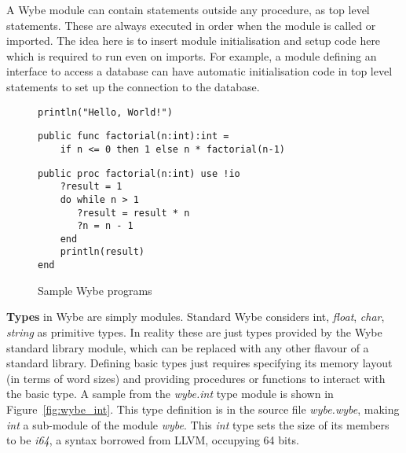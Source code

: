 A Wybe module can contain statements outside any procedure, as top level
statements. These are always executed in order when the module is called or
imported. The idea here is to insert module initialisation and setup code here
which is required to run even on imports. For example, a module defining an
interface to access a database can have automatic initialisation code in top
level statements to set up the connection to the database.


\begin{figure}

\begin{Verbatim}[frame=single,label=Simple Statement,labelposition=topline,framesep=4mm,fontsize=\small,commandchars=\\\{\}]
println("Hello, World!")
\end{Verbatim}

  \begin{Verbatim}[frame=single,label=Factorial Function,labelposition=topline,framesep=4mm,fontsize=\small,commandchars=\\\{\}]
public func factorial(n:int):int =
    if n <= 0 then 1 else n * factorial(n-1)
\end{Verbatim}

    \begin{Verbatim}[frame=single,label=Factorial Procedure with IO,labelposition=topline,framesep=4mm,fontsize=\small,commandchars=\\\{\}]
public proc factorial(n:int) use !io
    ?result = 1
    do while n > 1
       ?result = result * n
       ?n = n - 1
    end
    println(result)
end
\end{Verbatim}

  
  \caption{Sample Wybe programs}
  \label{fig:wybe_programs}
\end{figure}

\textbf{Types} in Wybe are simply modules. Standard Wybe considers {int},
\textit{float}, \textit{char}, \textit{string} as primitive types. In reality
these are just types provided by the Wybe standard library module, which can be
replaced with any other flavour of a standard library. Defining basic types
just requires specifying its memory layout (in terms of word sizes) and
providing procedures or functions to interact with the basic type. A sample
from the \textit{wybe.int} type module is shown in
Figure~\ref{fig:wybe_int}. This type definition is in the source file
\textit{wybe.wybe}, making \textit{int} a sub-module of the module
\textit{wybe}. This \textit{int} type sets the size of its members to be
\textit{i64}, a syntax borrowed from LLVM, occupying 64 bits.

